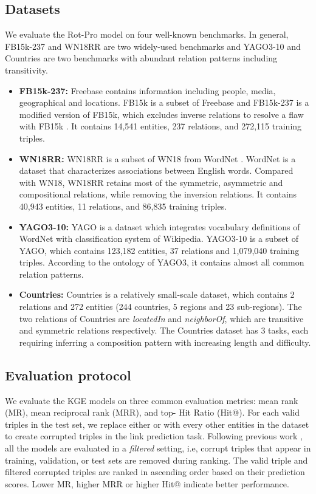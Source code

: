 \documentclass{article}
\begin{document}
\subsection{Datasets}
We evaluate the Rot-Pro model on four well-known  benchmarks. In general, FB15k-237 and WN18RR are two widely-used benchmarks and YAGO3-10 and Countries are two benchmarks with abundant relation patterns including transitivity.
\begin{itemize}
    \item \textbf{FB15k-237:} Freebase \citep{Freebase} contains information including people, media, geographical and locations. FB15k is a subset of Freebase and FB15k-237 \citep{fb15k-237} is a modified version of FB15k, which excludes inverse relations to resolve a flaw with FB15k \citep{conve}. It contains 14,541 entities, 237 relations, and 272,115 training triples.
    \item \textbf{WN18RR:} WN18RR \citep{conve} is a subset of WN18 \citep{transe} from WordNet \citep{Wordnet}. WordNet is a dataset that characterizes associations between English words. Compared with WN18, WN18RR retains most of the symmetric, asymmetric and compositional relations, while removing the inversion relations. It contains 40,943 entities, 11 relations, and 86,835 training triples.
    \item \textbf{YAGO3-10:} YAGO \citep{yago} is a dataset which integrates vocabulary definitions of WordNet with classification system of Wikipedia. YAGO3-10 \cite{yago3} is a subset of YAGO, which contains 123,182 entities, 37 relations and 1,079,040 training triples. According to the ontology of YAGO3, it contains almost all common relation patterns.
    \item \textbf{Countries:} Countries \citep{countries} is a relatively small-scale dataset, which contains 2 relations and 272 entities (244 countries, 5 regions and 23 sub-regions). The two relations of Countries are \emph{locatedIn} and \emph{neighborOf}, which are transitive and symmetric relations respectively. The Countries dataset has 3 tasks, each requiring inferring a composition pattern with increasing length and difficulty.
\end{itemize}

\subsection{Evaluation protocol}
We evaluate the KGE models on three common evaluation metrics: mean rank (MR), mean reciprocal rank (MRR), and top- Hit Ratio (Hit@).
For each valid triples  in the test set, we replace either  or  with every other entities in the dataset to create corrupted triples in the link prediction task. Following previous work \citep{transe,conve,convkb,zhang2019quaternion,kbat}, all the models are evaluated in a \emph{filtered} setting, i.e, corrupt triples that appear in training, validation, or test sets are removed during ranking. The valid triple and filtered corrupted triples are ranked in ascending order based on their prediction scores. Lower MR, higher MRR or higher Hit@ indicate better performance.
\end{document}
